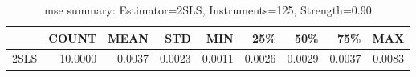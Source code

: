 \begin{table}[ht]
\centering
\caption{mse summary: Estimator=2SLS, Instruments=125, Strength=0.90}
\begin{tabular}{lrrrrrrrr}
\toprule
 & COUNT & MEAN & STD & MIN & 25\% & 50\% & 75\% & MAX \\
\midrule
2SLS & 10.0000 & 0.0037 & 0.0023 & 0.0011 & 0.0026 & 0.0029 & 0.0037 & 0.0083 \\
\bottomrule
\end{tabular}
\end{table}
